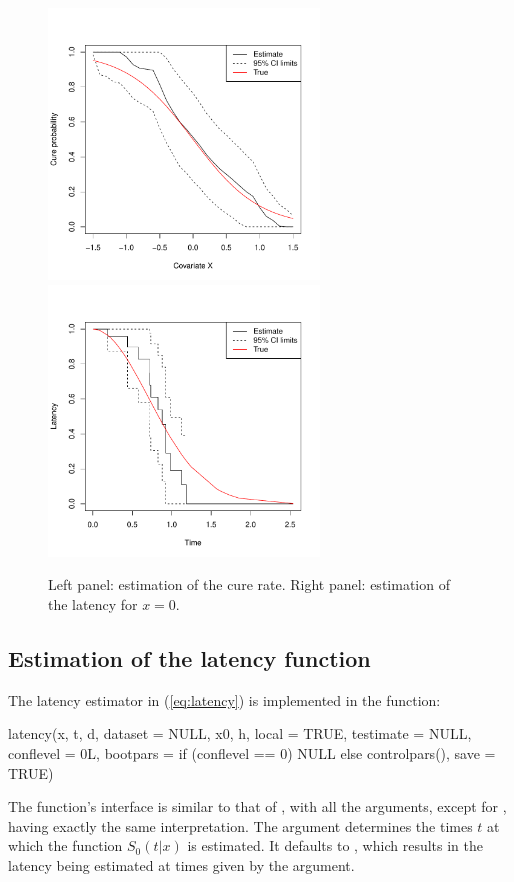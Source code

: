 \begin{figure}[htbp]
  \centering
  \includegraphics[width=7.2cm, height=7.2cm]{Figure-010}\includegraphics[width=7.2cm, height=7.2cm]{Figure-019}
  \caption{Left panel: estimation of the cure rate. Right panel: estimation of the latency for $x=0$.}
  \label{fig:cure_latency}
\end{figure}

\subsection{Estimation of the latency function} \label{sec:latency estimation}

The latency estimator in (\ref{eq:latency}) is implemented in the  function:

\begin{example}
latency(x, t, d, dataset = NULL, x0, h, local = TRUE, testimate = NULL,
  conflevel = 0L, bootpars = if (conflevel == 0) NULL else controlpars(),
  save = TRUE)
\end{example}

The function's interface is similar to that of , with all the arguments, except for , having exactly the same interpretation. The  argument determines the times $t$ at which the function $S_0\left(t|x \right)$ is estimated. It defaults to , which results in the latency being estimated at times given by the  argument.

